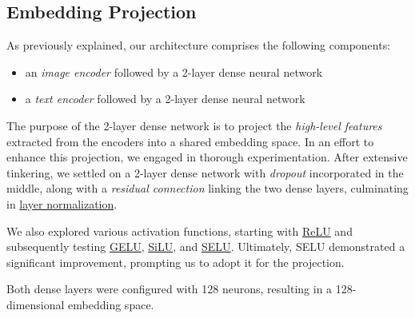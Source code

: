 \documentclass[12pt, a4paper]{article}
\begin{document}
\subsection{Embedding Projection}
As previously explained, our architecture comprises the following components:
\begin{itemize}
    \item an \textit{image encoder} followed by a 2-layer dense neural network
    \item a \textit{text encoder} followed by a 2-layer dense neural network
\end{itemize}
The purpose of the 2-layer dense network is to project the \textit{high-level features} extracted from the encoders into a shared embedding space. In an effort to enhance this projection, we engaged in thorough experimentation.
After extensive tinkering, we settled on a 2-layer dense network with \textit{dropout} incorporated in the middle, along with a \textit{residual connection} linking the two dense layers, culminating in \href{https://keras.io/api/layers/normalization_layers/layer_normalization/}{layer normalization}.

We also explored various activation functions, starting with \href{https://keras.io/api/layers/activation_layers/relu/}{ReLU} and subsequently testing \href{https://www.tensorflow.org/api_docs/python/tf/keras/activations/gelu}{GELU}, \href{https://www.tensorflow.org/api_docs/python/tf/nn/silu}{SiLU}, and \href{https://www.tensorflow.org/api_docs/python/tf/nn/selu}{SELU}. Ultimately, SELU demonstrated a significant improvement, prompting us to adopt it for the projection.

Both dense layers were configured with 128 neurons, resulting in a 128-dimensional embedding space.

\begin{center}
\end{center}    
\end{document}
